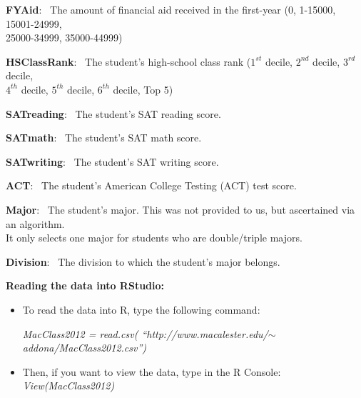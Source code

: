 \documentclass[12pt]{report}
\begin{document}
\noindent \textbf{FYAid}:~ The amount of financial aid received in the first-year (0, 1-15000, 15001-24999,\\\phantom{1}\hspace{1.65cm}25000-34999, 35000-44999) \vspace{1mm}

\noindent \textbf{HSClassRank}:~ The student's high-school class rank ($1^{st}$ decile, $2^{nd}$ decile, $3^{rd}$ decile,\\\phantom{1}\hspace{2.95cm} $4^{th}$ decile, $5^{th}$ decile, $6^{th}$ decile, Top 5) \vspace{1mm}

\noindent \textbf{SATreading}:~ The student's SAT reading score. \vspace{1mm}

\noindent \textbf{SATmath}:~ The student's SAT math score. \vspace{1mm}

\noindent \textbf{SATwriting}:~ The student's SAT writing score. \vspace{1mm}

\noindent \textbf{ACT}:~ The student's American College Testing (ACT) test score. \vspace{1mm}

\noindent \textbf{Major}:~ The student's major. This was not provided to us, but ascertained via an algorithm.\\\phantom{1}\hspace{1.35cm} It only selects one major for students who are double/triple majors.\vspace{1mm}

\noindent \textbf{Division}:~ The division to which the student's major belongs.\\ \vspace{4mm}

\noindent \textbf{Reading the data into RStudio:}
\begin{itemize}
\item To read the data into R, type the following command:

\emph{MacClass2012 = read.csv( ``http://www.macalester.edu/$\sim$addona/MacClass2012.csv'')}

\item Then, if you want to view the data, type in the R Console: \emph{View(MacClass2012)}
\end{itemize}

\newpage
\end{document}
